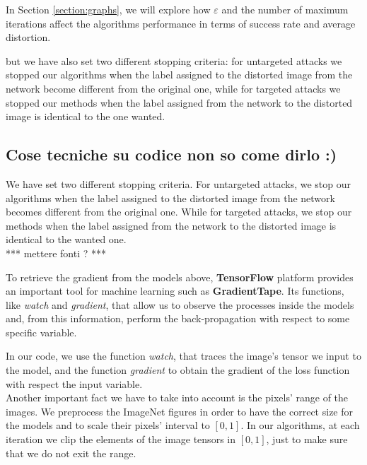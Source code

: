 \documentclass[10pt,twocolumn,letterpaper, english]{article}
\theoremstyle{definition}
\theoremstyle{plain}
\theoremstyle{plain}
\theoremstyle{plain}
\theoremstyle{plain}
\theoremstyle{remark}
\theoremstyle{remark}
\theoremstyle{definition}
\theoremstyle{definition}
\theoremstyle{definition}
\theoremstyle{definition}
\renewcommand{\epsilon}{\varepsilon}
\begin{document}
\noindent In Section \ref{section:graphs}, we will explore how $\epsilon$ and the number of maximum iterations affect the algorithms performance in terms of success rate and average distortion. 

but we have also set two different stopping criteria: for untargeted attacks we stopped our algorithms when the label assigned to the distorted image from the network become different from the original one, while for targeted attacks we stopped our methods when the label assigned from the network to the distorted image is identical to the one wanted. \\

\subsection{Cose tecniche su codice non so come dirlo :)}


We have set two different stopping criteria.
For untargeted attacks, we stop our algorithms when the label assigned to the distorted image from the network becomes different from the original one.
While for targeted attacks, we stop our methods when the label assigned from the network to the distorted image is identical to the wanted one.\\ 

*** mettere fonti ? ***

To retrieve the gradient from the models above, \textbf{TensorFlow} platform provides an important tool for machine learning such as \textbf{GradientTape}. 
Its functions, like \textit{watch} and \textit{gradient}, that allow us to observe the processes inside the models and, from this information, perform the back-propagation with respect to some specific variable.

In our code, we use the function \textit{watch}, that traces the image's tensor we input to the model, and the function \textit{gradient} to obtain the gradient of the loss function with respect the input variable.\\


Another important fact we have to take into account is the pixels' range of the images. 
We preprocess the ImageNet figures in order to have the correct size for the models and to scale their pixels' interval to $[0,1]$. 
In our algorithms, at each iteration we clip the elements of the image tensors in $[0,1]$, just to make sure that we do not exit the range. \\
\end{document}
